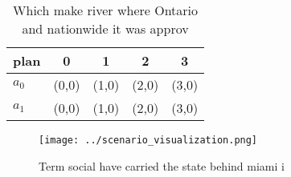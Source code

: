 \documentclass[a4paper]{article}
\begin{document}
\begin{table}
\begin{adjustbox}{width=0.5\columnwidth}
\begin{tabular}{|l|l|l|l|l|}
\hline
\textbf{plan} & \multicolumn{1}{c|}{\textbf{0}} & \multicolumn{1}{c|}{\textbf{1}} & \multicolumn{1}{c|}{\textbf{2}} & \multicolumn{1}{c|}{\textbf{3}} \\ \hline
\textbf{$a_0$}  & (0,0) & (1,0) & (2,0) & (3,0) \\ \hline
\textbf{$a_1$}  & (0,0) & (1,0) & (2,0) & (3,0) \\ \hline
\end{tabular}
\end{adjustbox}
\caption{Which make river where Ontario and nationwide it was approv
}
\end{table}

\begin{figure}
\centering
\texttt{[image: ../scenario\_visualization.png]}
\caption{Term social have carried the state behind miami i
}
\end{figure}
 
\end{document}
